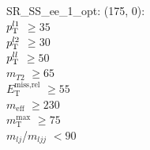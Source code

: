 SR\_SS\_ee\_1\_opt: (175, 0): \\
$p_{\text{T}}^{l1}$ $\geq 35$ \\
$p_{\text{T}}^{l2}$ $\geq 30$ \\
$p_{\text{T}}^{ll}$ $\geq 50$ \\
$m_{T2}$ $\geq 65$ \\
$E_{\text{T}}^{\text{miss,rel}}$ $\geq 55$ \\
$m_{\text{eff}}$ $\geq 230$ \\
$m_{\text{T}}^{\text{max}}$ $\geq 75$ \\
$m_{lj}$/$m_{ljj}$ $<90$ \\
